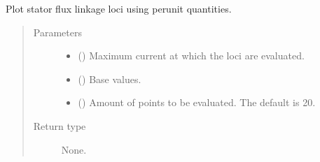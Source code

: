 \documentclass[letterpaper,10pt,english]{sphinxmanual}
\begin{document}
\begin{fulllineitems}
\begin{fulllineitems}
\end{fulllineitems}


\begin{fulllineitems}
\label{\detokenize{control.sm:control.sm.torque.TorqueCharacteristics.plot_flux_loci}}
\pysigstartsignatures
{}
\pysigstopsignatures
\sphinxAtStartPar
Plot stator flux linkage loci using per\sphinxhyphen{}unit quantities.
\begin{quote}\begin{description}
\item[{Parameters}] \leavevmode\begin{itemize}
\item {} 
\sphinxAtStartPar
{} () \textendash{} Maximum current at which the loci are evaluated.

\item {} 
\sphinxAtStartPar
{} () \textendash{} Base values.

\item {} 
\sphinxAtStartPar
{} (\sphinxstyleliteralemphasis{\sphinxupquote{, }}) \textendash{} Amount of points to be evaluated. The default is 20.

\end{itemize}

\item[{Return type}] \leavevmode
\sphinxAtStartPar
None.

\end{description}\end{quote}

\end{fulllineitems}



\end{fulllineitems}
\end{document}
